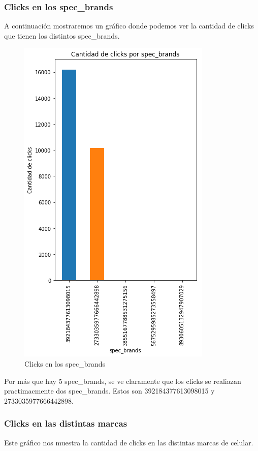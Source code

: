 \documentclass[a4paper, 12pt]{article}
\begin{document}
	\subsubsection{Clicks en los spec\_brands}
		 A continuación mostraremos un gráfico donde podemos ver la cantidad de clicks que tienen los distintos spec\_brands.


		\begin{figure}[H]
			\centering
			\includegraphics[scale = 0.7]{images/clicks/clicks_specs_brand.png}
			\caption{Clicks en los spec\_brands}
		\end{figure}


		 Por más que hay 5 spec\_brands, se ve claramente que los clicks se realiazan practimacmente dos spec\_brands.
		Estos son 392184377613098015 y 2733035977666442898.
		

	\subsubsection{Clicks en las distintas marcas}
		 Este gráfico nos muestra la cantidad de clicks en las distintas marcas de celular.
\end{document}
